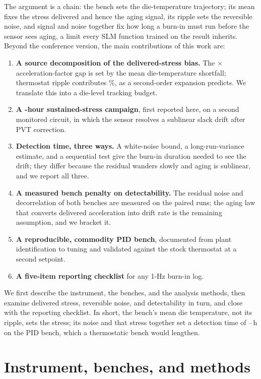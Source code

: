 \documentclass[10pt,twocolumn]{article}
\begin{document}
The argument is a chain: the bench sets the die-temperature trajectory; its mean fixes the stress delivered and hence the aging signal, its ripple sets the reversible noise, and signal and noise together fix how long a burn-in must run before the sensor sees aging, a limit every SLM function trained on the result inherits. Beyond the conference version, the main contributions of this work are:
\begin{enumerate}
\item \textbf{A source decomposition of the delivered-stress bias.} The \vAFratio$\times$ acceleration-factor gap is set by the mean die-temperature shortfall; thermostat ripple contributes \vRippleBB\%, as a second-order expansion predicts. We translate this into a die-level tracking budget.
\item \textbf{A \vDurRCA-hour sustained-stress campaign}, first reported here, on a second monitored circuit, in which the sensor resolves a sublinear slack drift after PVT correction.
\item \textbf{Detection time, three ways.} A white-noise bound, a long-run-variance estimate, and a sequential test give the burn-in duration needed to see the drift; they differ because the residual wanders slowly and aging is sublinear, and we report all three.
\item \textbf{A measured bench penalty on detectability.} The residual noise and decorrelation of both benches are measured on the paired runs; the aging law that converts delivered acceleration into drift rate is the remaining assumption, and we bracket it.
\item \textbf{A reproducible, commodity PID bench}, documented from plant identification to tuning and validated against the stock thermostat at a second setpoint.
\item \textbf{A five-item reporting checklist} for any 1-Hz burn-in log.
\end{enumerate}

We first describe the instrument, the benches, and the analysis methods, then examine delivered stress, reversible noise, and detectability in turn, and close with the reporting checklist. In short, the bench's mean die temperature, not its ripple, sets the stress; its noise and that stress together set a detection time of \vTminSeq--\vTminLrv\,h on the PID bench, which a thermostatic bench would lengthen.

\section{Instrument, benches, and methods}
\end{document}
